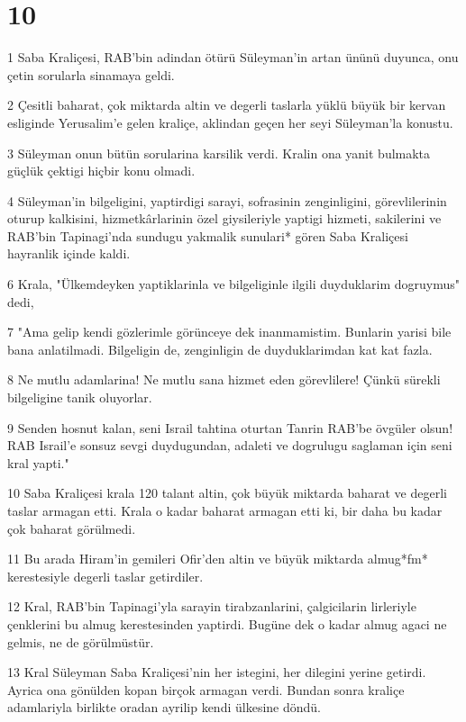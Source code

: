 \chapter{10}

\par 1 Saba Kraliçesi, RAB'bin adindan ötürü Süleyman'in artan ününü duyunca, onu çetin sorularla sinamaya geldi.
\par 2 Çesitli baharat, çok miktarda altin ve degerli taslarla yüklü büyük bir kervan esliginde Yerusalim'e gelen kraliçe, aklindan geçen her seyi Süleyman'la konustu.
\par 3 Süleyman onun bütün sorularina karsilik verdi. Kralin ona yanit bulmakta güçlük çektigi hiçbir konu olmadi.
\par 4 Süleyman'in bilgeligini, yaptirdigi sarayi, sofrasinin zenginligini, görevlilerinin oturup kalkisini, hizmetkârlarinin özel giysileriyle yaptigi hizmeti, sakilerini ve RAB'bin Tapinagi'nda sundugu yakmalik sunulari* gören Saba Kraliçesi hayranlik içinde kaldi.
\par 6 Krala, "Ülkemdeyken yaptiklarinla ve bilgeliginle ilgili duyduklarim dogruymus" dedi,
\par 7 "Ama gelip kendi gözlerimle görünceye dek inanmamistim. Bunlarin yarisi bile bana anlatilmadi. Bilgeligin de, zenginligin de duyduklarimdan kat kat fazla.
\par 8 Ne mutlu adamlarina! Ne mutlu sana hizmet eden görevlilere! Çünkü sürekli bilgeligine tanik oluyorlar.
\par 9 Senden hosnut kalan, seni Israil tahtina oturtan Tanrin RAB'be övgüler olsun! RAB Israil'e sonsuz sevgi duydugundan, adaleti ve dogrulugu saglaman için seni kral yapti."
\par 10 Saba Kraliçesi krala 120 talant altin, çok büyük miktarda baharat ve degerli taslar armagan etti. Krala o kadar baharat armagan etti ki, bir daha bu kadar çok baharat görülmedi.
\par 11 Bu arada Hiram'in gemileri Ofir'den altin ve büyük miktarda almug*fm* kerestesiyle degerli taslar getirdiler.
\par 12 Kral, RAB'bin Tapinagi'yla sarayin tirabzanlarini, çalgicilarin lirleriyle çenklerini bu almug kerestesinden yaptirdi. Bugüne dek o kadar almug agaci ne gelmis, ne de görülmüstür.
\par 13 Kral Süleyman Saba Kraliçesi'nin her istegini, her dilegini yerine getirdi. Ayrica ona gönülden kopan birçok armagan verdi. Bundan sonra kraliçe adamlariyla birlikte oradan ayrilip kendi ülkesine döndü.
